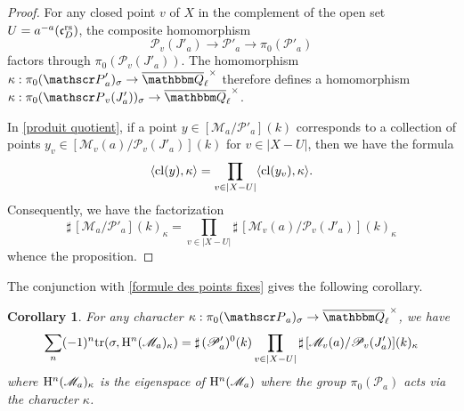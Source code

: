 \documentclass[12pt,english]{smfart}
\numberwithin{equation}{subsection}
\newtheorem{corollaire}[equation]{Corollary}
\theoremstyle{remark}
\newcommand\calP{{\mathscr P}}
\newcommand\calM{{\mathscr M}}
\newcommand\frakc{{\mathfrak c}}
\newcommand\QQ{{\mathbbm Q}}
\newcommand\rmH{{\rm H}}
\newcommand\tr{{\rm tr}}
\newcommand\cl{{\rm cl}}
\newcommand\rs{{\rm rs}}
\newcommand\Ql{{\overline\QQ_\ell}}
\begin{document}
\begin{proof}
For any closed point $v$ of $X$ in the complement of the open set
$U=a^{-a}(\frakc_D^\rs)$, the composite homomorphism
$$\calP_v(J'_a)\rightarrow \calP'_a \rightarrow \pi_0(\calP'_a)$$
factors through $\pi_0(\calP_v(J'_a))$. The homomorphism
$\kappa:\pi_0(\calP'_a)_\sigma \rightarrow \Ql^\times$ therefore defines a
homomorphism $\kappa:\pi_0(\calP_v(J'_a))_\sigma \rightarrow
\Ql^\times$.

In \ref{produit quotient}, if a point $y\in [\calM_a/ \calP'_a](k)$
corresponds to a collection of points $y_v\in [\calM_v(a)/
\calP_v(J'_a)](k)$ for $v\in |X-U|$, then we have the formula
$$\langle \cl(y),\kappa \rangle =\prod_{v\in |X-U|}  \langle \cl(y_v),\kappa \rangle.$$
Consequently, we have the factorization
$$\sharp\,[\calM_a/ \calP'_a](k)_\kappa=\prod_{v\in |X-U|}
\sharp\,[\calM_v(a)/\calP_v(J'_a)](k)_\kappa$$
whence the proposition.
\end{proof}

The conjunction with \ref{formule des points fixes} gives the following
corollary.

\begin{corollaire}\label{formule des points fixes Hitchin}
For any character $\kappa:\pi_0(\calP_a)_\sigma\rightarrow
\Ql^\times$, we have
$$\sum_n (-1)^n\tr(\sigma, \rmH^n(\calM_a)_\kappa)
= {\sharp\,}
(\calP'_a)^0(k)\prod_{v\in |X-U|}
\sharp\,[\calM_v(a)/\calP_v(J'_a)](k)_\kappa
$$
where $\rmH^n(\calM_a)_\kappa$ is the eigenspace of
$\rmH^n(\calM_a)$ where the group $\pi_0(\calP_a)$ acts via the
character $\kappa$.
\end{corollaire}
\end{document}
